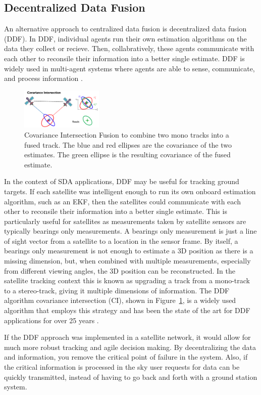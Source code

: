 \subsection{Decentralized Data Fusion}

An alternative approach to centralized data fusion is decentralized data fusion (DDF). In DDF, individual agents run their own estimation algorithms on the data they collect or recieve.
Then, collabratively, these agents communicate with each other to reconsile their information into a better single estimate. DDF is widely used in multi-agent systems where agents are able to sense, communicate, and process information \cite{b1}.

\begin{figure}[h]
    \centering
    \includegraphics[width=0.35\textwidth]{figs/covariance_intersection.png}
    \caption{Covariance Intersection Fusion to combine two mono tracks into a fused track. The blue and red ellipses are the covariance of the two estimates. The green ellipse is the resulting covariance of the fused estimate. }
    \label{fig:ci_fusion}
\end{figure}

In the context of SDA applications, DDF may be useful for tracking ground targets. If each satellite was intelligent enough to run its own onboard estimation algorithm, such as an EKF,
then the satellites could communicate with each other to reconsile their information into a better single estimate.
This is particularly useful for satellites as measurements taken by satellite sensors are typically bearings only measurements. 
A bearings only measurement is just a line of sight vector from a satellite to a location in the sensor frame.
By itself, a bearings only measurement is not enough to estimate a 3D position as there is a missing dimension, but, when combined with multiple measurements, especially from different viewing angles, the 3D position can be reconstructed.
In the satellite tracking context this is known as upgrading a track from a mono-track to a stereo-track, giving it multiple dimensions of information.
The DDF algorithm covariance intersection (CI), shown in Figure~\ref{fig:ci_fusion}, is a widely used algorithm that employs this strategy and has been the state of the art for DDF applications for over 25 years \cite{b4}. 

If the DDF approach was implemented in a satellite network, it would allow for much more robust tracking and agile decision making. By decentralizing the data and information, you remove the critical point of failure in the system. 
Also, if the critical information is processed in the sky user requests for data can be quickly transmitted, instead of having to go back and forth with a ground station system.



